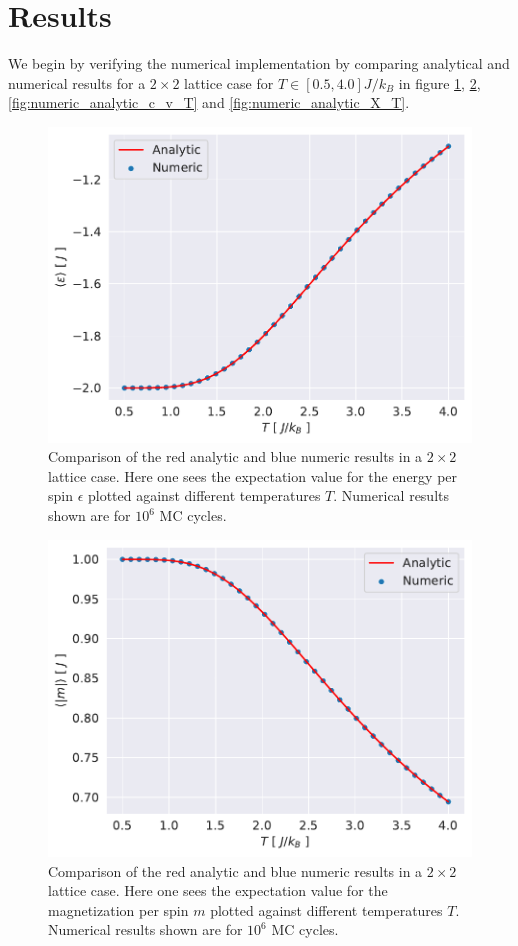 \documentclass[english,notitlepage,reprint,nofootinbib]{revtex4-1}  %
\begin{document}
\section{Results}\label{sec:results}
We begin by verifying the numerical implementation by comparing  analytical and numerical results for a $2\times2$ lattice case for $T \in [0.5,4.0]J/k_B$ in figure \ref{fig:numeric_analytic_e_T}, \ref{fig:numeric_analytic_m_T}, \ref{fig:numeric_analytic_c_v_T} and \ref{fig:numeric_analytic_X_T}.

\begin{figure}[H]
    \centering
    \includegraphics[width=.5\textwidth]{../figures/numeric_analytic_e_T.pdf}
    \caption{Comparison of the red analytic and blue numeric results in a $2\times2$ lattice case. Here one sees the expectation value for the energy per spin $\epsilon$ plotted against different temperatures $T$. Numerical results shown are for $10^6$ MC cycles.}
    \label{fig:numeric_analytic_e_T}
\end{figure}

\begin{figure}[H]
    \centering
    \includegraphics[width=.5\textwidth]{../figures/numeric_analytic_m_T.pdf}
    \caption{Comparison of the red analytic and blue numeric results in a $2\times2$ lattice case. Here one sees the expectation value for the magnetization per spin $m$ plotted against different temperatures $T$. Numerical results shown are for $10^6$ MC cycles.}
    \label{fig:numeric_analytic_m_T}
\end{figure}
\end{document}
